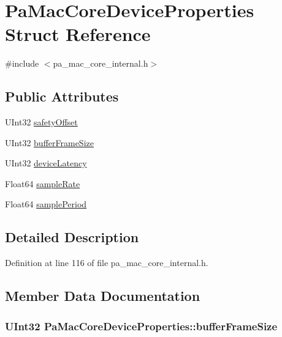 \hypertarget{struct_pa_mac_core_device_properties}{}\section{Pa\+Mac\+Core\+Device\+Properties Struct Reference}
\label{struct_pa_mac_core_device_properties}


{\ttfamily \#include $<$pa\+\_\+mac\+\_\+core\+\_\+internal.\+h$>$}

\subsection*{Public Attributes}
\begin{DoxyCompactItemize}
\item 
U\+Int32 \hyperlink{struct_pa_mac_core_device_properties_ab303037c6a88e4b54f706f2d5d0be00c}{safety\+Offset}
\item 
U\+Int32 \hyperlink{struct_pa_mac_core_device_properties_a7a0781d3b3414f23abc663b17cb06c7d}{buffer\+Frame\+Size}
\item 
U\+Int32 \hyperlink{struct_pa_mac_core_device_properties_aaa0297847bc0987b066f0ece4ef0c532}{device\+Latency}
\item 
Float64 \hyperlink{struct_pa_mac_core_device_properties_a0da4b19e2993717c1e09ab86a6930ee4}{sample\+Rate}
\item 
Float64 \hyperlink{struct_pa_mac_core_device_properties_a4124e492be364add3280ef5574a26fde}{sample\+Period}
\end{DoxyCompactItemize}


\subsection{Detailed Description}


Definition at line 116 of file pa\+\_\+mac\+\_\+core\+\_\+internal.\+h.



\subsection{Member Data Documentation}
\subsubsection[{\texorpdfstring{buffer\+Frame\+Size}{bufferFrameSize}}]{\setlength{\rightskip}{0pt plus 5cm}U\+Int32 Pa\+Mac\+Core\+Device\+Properties\+::buffer\+Frame\+Size}\hypertarget{struct_pa_mac_core_device_properties_a7a0781d3b3414f23abc663b17cb06c7d}{}\label{struct_pa_mac_core_device_properties_a7a0781d3b3414f23abc663b17cb06c7d}


